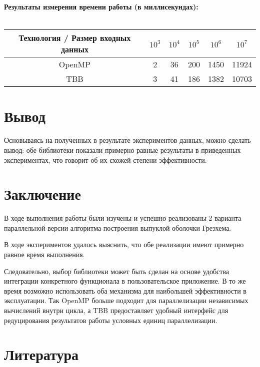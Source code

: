 \documentclass[14pt, a4paper]{extarticle}
\begin{document}
  \noindent\textbf{Результаты измерения времени работы (в миллисекундах):}\\\\
    \begin{tabular}{|c | c | c | c | c | c |} 
      \hline
      Технология / Размер входных данных & $10^3$ & $10^4$ & $10^5$ & $10^6$ & $10^7$ \\
      \hline
      OpenMP & 2 & 36  & 200 & 1450 & 11924 \\ 
      \hline
      TBB & 3 & 41  & 186 & 1382 & 10703 \\ 
      \hline
    \end{tabular}

  \newpage

  \section{Вывод}
  Основываясь на полученных в результате экспериментов данных, можно сделать вывод: обе библиотеки показали примерно равные результаты в приведенных экспериментах, что говорит об их схожей степени эффективности.

  \newpage

  \section{Заключение}
  В ходе выполнения работы были изучены и успешно реализованы 2 варианта параллельной версии алгоритма построения выпуклой оболочки Греэхема.
 
  В ходе экспериментов удалось выяснить, что обе реализации имеют примерно равное время выполнения.
 
    Следовательно, выбор библиотеки может быть сделан на основе удобства интеграции конкретного функционала в пользовательское приложение. В то же время возможно использовать оба механизма для наибольшей эффективности в эксплуатации. Так OpenMP больше подходит для параллелизации независимых вычислений внутри цикла, а TBB предоставляет удобный интерфейс для редуцирования результатов работы условных единиц параллелизации.
 
  \newpage

    \section{Литература}
    
\end{document}
